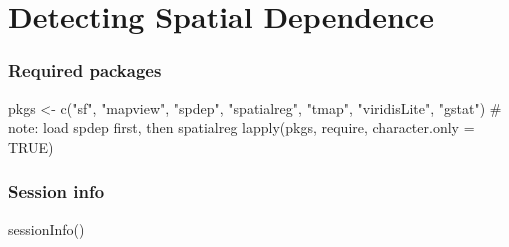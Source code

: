 \documentclass[
  letterpaper,
  DIV=11,
  numbers=noendperiod]{scrreprt}
\newenvironment{Shaded}{\begin{snugshade}}{\end{snugshade}}
\newcommand{\AttributeTok}[1]{\textcolor[rgb]{0.40,0.45,0.13}{#1}}
\newcommand{\CommentTok}[1]{\textcolor[rgb]{0.37,0.37,0.37}{#1}}
\newcommand{\ConstantTok}[1]{\textcolor[rgb]{0.56,0.35,0.01}{#1}}
\newcommand{\FunctionTok}[1]{\textcolor[rgb]{0.28,0.35,0.67}{#1}}
\newcommand{\NormalTok}[1]{\textcolor[rgb]{0.00,0.23,0.31}{#1}}
\newcommand{\OtherTok}[1]{\textcolor[rgb]{0.00,0.23,0.31}{#1}}
\newcommand{\StringTok}[1]{\textcolor[rgb]{0.13,0.47,0.30}{#1}}
\begin{document}

\hypertarget{detecting-spatial-dependence}{%
\chapter{Detecting Spatial
Dependence}\label{detecting-spatial-dependence}}

\newcommand{\Exp}{\mathrm{E}}
\newcommand\given[1][]{\:#1\vert\:}
\newcommand{\Cov}{\mathrm{Cov}}
\newcommand{\Var}{\mathrm{Var}}
\newcommand{\rank}{\mathrm{rank}}
\newcommand{\bm}[1]{\boldsymbol{\mathbf{#1}}}

\hypertarget{required-packages-4}{%
\subsection*{Required packages}\label{required-packages-4}}

\begin{Shaded}
\begin{Highlighting}[]
\NormalTok{pkgs }\OtherTok{\textless{}{-}} \FunctionTok{c}\NormalTok{(}\StringTok{"sf"}\NormalTok{, }\StringTok{"mapview"}\NormalTok{, }\StringTok{"spdep"}\NormalTok{, }\StringTok{"spatialreg"}\NormalTok{, }\StringTok{"tmap"}\NormalTok{, }\StringTok{"viridisLite"}\NormalTok{, }\StringTok{"gstat"}\NormalTok{) }\CommentTok{\# note: load spdep first, then spatialreg}
\FunctionTok{lapply}\NormalTok{(pkgs, require, }\AttributeTok{character.only =} \ConstantTok{TRUE}\NormalTok{)}
\end{Highlighting}
\end{Shaded}

\hypertarget{session-info-4}{%
\subsection*{Session info}\label{session-info-4}}

\begin{Shaded}
\begin{Highlighting}[]
\FunctionTok{sessionInfo}\NormalTok{()}
\end{Highlighting}
\end{Shaded}
\end{document}
